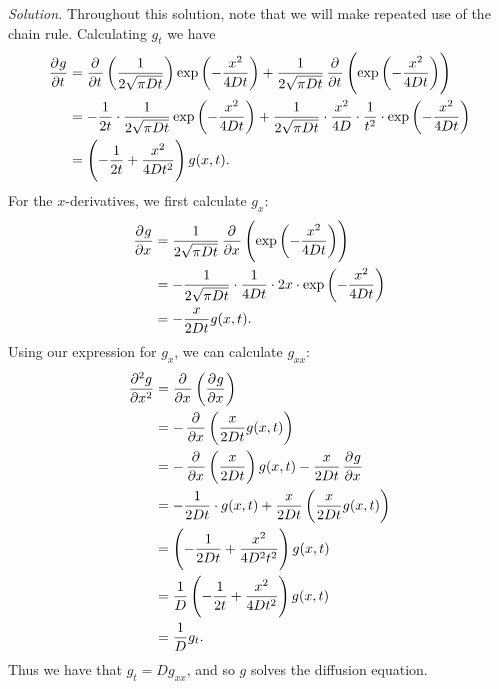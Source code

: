 \documentclass{article}
\begin{document}
\textit{Solution.}
Throughout this solution, note that we will make repeated use of the chain rule.
Calculating $g_t$ we have
%
\begin{align*}
    \dpd{g}{t}
        &=
        \dpd{}{t} \del{\frac{1}{2 \sqrt{\pi D t}}} \exp \del[3]{- \frac{x^2}{4 D t}}
        +
        \frac{1}{2 \sqrt{\pi D t}} \dpd{}{t} \del{\exp \del[3]{- \frac{x^2}{4 D t}}}
        \\
        &=
        -
        \frac{1}{2 t} \cdot \frac{1}{2 \sqrt{\pi D t}} \exp \del[3]{- \frac{x^2}{4 D t}}
        +
        \frac{1}{2 \sqrt{\pi D t}} \cdot \frac{x^2}{4D} \cdot \frac{1}{t^2} \cdot \exp \del[3]{- \frac{x^2}{4 D t}}
        \\
        &=
        \del{- \frac{1}{2 t} + \frac{x^2}{4Dt^2}} g(x, t)
        .
\end{align*}
%
For the $x$-derivatives, we first calculate $g_x$:
%
\begin{align*}
    \dpd{g}{x}
        &= \frac{1}{2 \sqrt{\pi D t}} \dpd{}{x} \del{\exp \del[3]{- \frac{x^2}{4 D t}}}
        \\
        &= - \frac{1}{2 \sqrt{\pi D t}} \cdot \frac{1}{4Dt} \cdot 2 x \cdot \exp \del[3]{- \frac{x^2}{4 D t}}
        \\
        &= - \frac{x}{2Dt} g(x, t)
        .
\end{align*}
%
Using our expression for $g_x$, we can calculate $g_{xx}$:
%
\begin{align*}
    \dpd[2]{g}{x}
        &= \dpd{}{x} \del{\dpd{g}{x}}
        \\
        &= - \dpd{}{x} \del{\frac{x}{2Dt} g(x, t)}
        \\
        &=
        -
        \dpd{}{x} \del{\frac{x}{2Dt}} g(x, t)
        -
        \frac{x}{2Dt} \dpd{g}{x}
        \\
        &=
        -
        \frac{1}{2Dt} \cdot g(x, t)
        +
        \frac{x}{2Dt} \del{\frac{x}{2Dt} g(x, t)}
        \\
        &=
        \del{- \frac{1}{2 D t} + \frac{x^2}{4 D^2 t^2}} g(x, t)
        \\
        &=
        \frac{1}{D} \del{- \frac{1}{2 t} + \frac{x^2}{4 D t^2}} g(x, t)
        \\
        &=
        \frac{1}{D} g_t
        .
\end{align*}
%
Thus we have that $g_t = D g_{xx}$, and so $g$ solves the diffusion equation.

\vspace{5mm}
\end{document}
